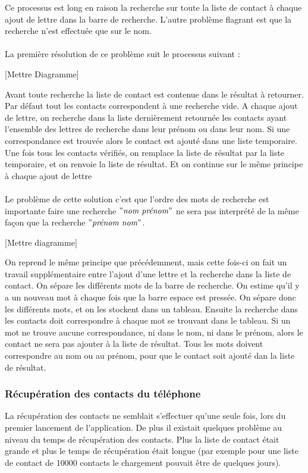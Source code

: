 Ce processus est long en raison la recherche sur toute la liste de contact à chaque ajout de lettre dans la barre de recherche. L'autre problème flagrant est que la recherche n'est effectuée que sur le nom.\\\\

La première résolution de ce problème suit le processus suivant :

[Mettre Diagramme]

Avant toute recherche la liste de contact est contenue dans le résultat à retourner. Par défaut tout les contacts correspondent à une recherche vide. A chaque ajout de lettre, on recherche dans la liste dernièrement retournée les contacts ayant l'ensemble des lettres de recherche dans leur prénom ou dans leur nom. Si une correspondance est trouvée alors le contact est ajouté dans une liste temporaire. Une fois tous les contacts vérifiés, on remplace la liste de résultat par la liste temporaire, et on renvoie la liste de résultat. Et on continue sur le même principe à chaque ajout de lettre\\\\

Le problème de cette solution c'est que l'ordre des mots de recherche est importante faire une recherche $"\textit{nom prénom}"$ ne sera pas interprété de la même façon que la recherche $"\textit{prénom nom}"$.

[Mettre diagramme]

On reprend le même principe que précédemment, mais cette fois-ci on fait un travail supplémentaire entre l'ajout d'une lettre et la recherche dans la liste de contact. On sépare les différents mots de la barre de recherche. On estime qu'il y a un nouveau mot à chaque fois que la barre espace est pressée. On sépare donc les différents mots, et on les stockent dans un tableau. Ensuite la recherche dans les contacts doit correspondre à chaque mot se trouvant dans le tableau. Si un mot ne trouve aucune correspondance, ni dans le nom, ni dans le prénom, alors le contact ne sera pas ajouter à la liste de résultat. Tous les mots doivent correspondre au nom ou au prénom, pour que le contact soit ajouté dan la liste de résultat.

\subsubsection{Récupération des contacts du téléphone}

La récupération des contacts ne semblait s'effectuer qu'une seule fois, lors du premier lancement de l'application. De plus il existait quelques problème au niveau du temps de récupération des contacts. Plus la liste de contact était grande et plus le temps de récupération était longue (par exemple pour une liste de contact de 10000 contacts le chargement pouvait être de quelques jours).\\

